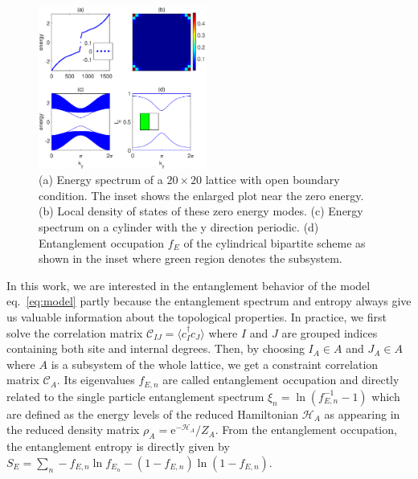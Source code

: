 \documentclass[doublecol]{epl2} %
\newcommand{\me}{\mathrm{e}}
\begin{document}
\begin{figure}
	\includegraphics[width=0.49\textwidth]{model.eps}
	\caption{\label{fig:model} (a) Energy spectrum of a $20\times20$ lattice with open boundary condition. The inset shows the enlarged plot near the zero energy. (b) Local density of states of these zero energy modes. (c) Energy spectrum on a cylinder with the y direction periodic. (d) Entanglement occupation $f_E$ of the cylindrical bipartite scheme as shown in the inset where green region denotes the subsystem. }
\end{figure}

In this work, we are interested in the entanglement behavior of the model eq.~\ref{eq:model} partly because the entanglement spectrum and entropy always give us valuable information about the topological properties. In practice, we first solve the correlation matrix $\mathcal{C}_{IJ}=\langle c_I^\dag c_J \rangle$ where $I$ and $J$ are grouped indices containing both site and internal degrees. Then, by choosing $I_A\in A$ and $J_A\in A$ where $A$ is a subsystem of the whole lattice, we get a constraint correlation matrix $\mathcal{C}_A$. \cite{Peschel_JPAMG_2003, Ryu_PRB_2006} Its eigenvalues $f_{E,n}$ are called entanglement occupation and directly related to the single particle entanglement spectrum $\xi_n=\ln\left(f_{E,n}^{-1}-1\right)$ which are defined as the energy levels of the reduced Hamiltonian $\mathcal{H}_A$ as appearing in the reduced density matrix $\rho_A=\me^{-\mathcal{H}_A}/Z_A$. From the entanglement occupation, the entanglement entropy is directly given by $S_E=\sum_n -f_{E,n}\ln f_{E_n} - (1-f_{E,n})\ln(1-f_{E,n}) $. 
\end{document}
